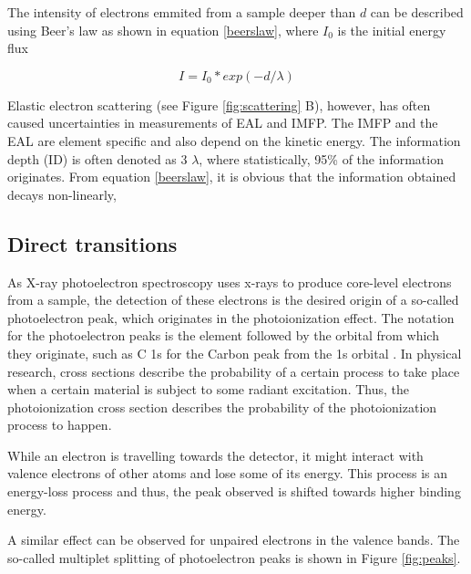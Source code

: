 The intensity of electrons emmited from a sample deeper than $d$ can be described using Beer's law as shown in equation \ref{beerslaw}, where $I_{0}$ is the initial energy flux

\begin{equation}
\label{beerslaw}
    I = I_{0} * exp(-d/\lambda)
\end{equation}

Elastic electron scattering (see Figure \ref{fig:scattering} B), however, has often caused uncertainties in measurements of EAL and IMFP. The IMFP and the EAL are element specific and also depend on the kinetic energy. 
The information depth (ID) is often denoted as 3 $\lambda$, where statistically, 95\% of the information originates. From equation \ref{beerslaw}, it is obvious that the information obtained decays non-linearly, 

\subsection{Direct transitions}
As X-ray photoelectron spectroscopy uses x-rays to produce core-level electrons from a sample, the detection of these electrons is the desired origin of a so-called photoelectron peak, which originates in the photoionization effect. The notation for the photoelectron peaks is the element followed by the orbital from which they originate, such as C 1s for the Carbon peak from the 1s orbital \cite{stevie_introduction_2020}. In physical research, cross sections describe the probability of a certain process to take place when a certain material is subject to some radiant excitation. Thus, the photoionization cross section describes the probability of the photoionization process to happen. 

While an electron is travelling towards the detector, it might interact with valence electrons of other atoms and lose some of its energy. This process is an energy-loss process and thus, the peak observed is shifted towards higher binding energy.

A similar effect can be observed for unpaired electrons in the valence bands. The so-called multiplet splitting of photoelectron peaks is shown in Figure \ref{fig:peaks}.



